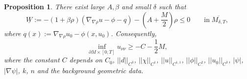 \documentclass[12pt]{amsart}
\newtheorem{proposition}[theorem]{Proposition}
\theoremstyle{definition}
\theoremstyle{remark}
\numberwithin{equation}{section}
\begin{document}
\begin{proposition}\label{C2_nn_inf_u_nn}
	There exist large $A, \beta$ and small $\delta$ such that
	\begin{equation}\label{C2_nn_ineq_2}
	\underline{W} := - (1 + \beta \rho) \left( \nabla_{\nabla \rho} u - \phi - q \right) - (A + \frac{M}{2}) \rho \leq 0 \qquad \text{in} \; \overline{M_{\delta, T}},
	\end{equation}
	where $q(x) := \nabla_{\nabla \rho} u_0 - \phi(x, u_0)$. Consequently, 
	\begin{equation}%
	\inf_{\partial M \times [0, T]} u_{\nu\nu} \geq - C - \frac{1}{2} M,
	\end{equation}
	where the constant $C$ depends on $C_0$, $||d||_{C^3}$, $||\chi||_{C^1}$, $||u||_{C^{1, 1}}$, $||\phi||_{C^2}$, $||u_0||_{C^{3}}$, $|\psi|$, $|\nabla \psi|$, $k$, $n$ and the background geometric data.
\end{proposition}
\end{document}
